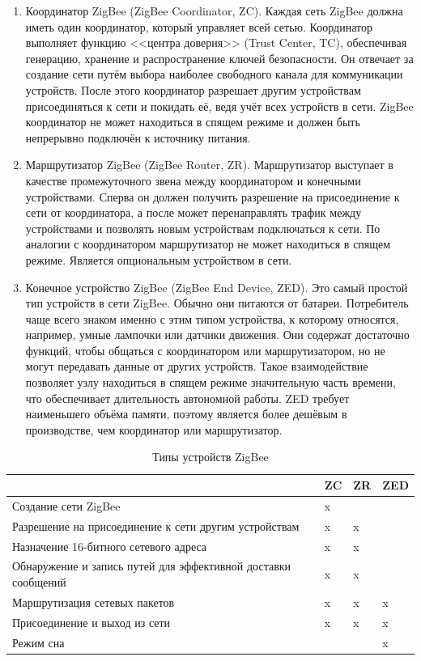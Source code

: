 	\begin{enumerate}
		\item Координатор ZigBee (ZigBee Coordinator, ZC). Каждая сеть ZigBee должна иметь один координатор,
		который управляет всей сетью. Координатор выполняет функцию <<центра доверия>> (Trust Center, TC),
		обеспечивая генерацию, хранение и распространение ключей безопасности. Он отвечает за создание сети
		путём выбора наиболее свободного канала для коммуникации устройств. После этого координатор 
		разрешает другим устройствам присоединяться к сети и покидать её, ведя учёт всех устройств в сети.
		ZigBee координатор не может находиться в спящем режиме и должен быть непрерывно подключён
		к источнику питания.
		\item Маршрутизатор ZigBee (ZigBee Router, ZR). Маршрутизатор выступает в качестве промежуточного
		звена между координатором и конечными устройствами. Сперва он должен получить разрешение на
		присоединение к сети от координатора, а после может перенаправлять трафик между устройствами и 
		позволять новым устройствам подключаться к сети. По аналогии с координатором маршрутизатор не
		может находиться в спящем режиме. Является опциональным устройством в сети.
		\item Конечное устройство ZigBee (ZigBee End Device, ZED). Это самый простой тип устройств в сети
		ZigBee. Обычно они питаются от батареи. Потребитель чаще всего знаком именно с этим типом
		устройства, к которому относятся, например, умные лампочки или датчики движения. Они содержат 
		достаточно функций, чтобы общаться с координатором или маршрутизатором, но не могут передавать 
		данные от других устройств. Такое взаимодействие позволяет узлу находиться в спящем режиме 
		значительную часть времени, что обеспечивает длительность автономной работы. ZED требует 
		наименьшего объёма памяти, поэтому является более дешёвым в производстве, чем координатор 
		или маршрутизатор.
	\end{enumerate}

	\begin{table}[h]
		\centering
		\begin{tabular}{ | p{9cm} | p{1cm} | p{1cm} | p{1cm} | }
			\hline
			& ZC & ZR & ZED \\ \hline
			Создание сети ZigBee & x &  &  \\ \hline
			Разрешение на присоединение к сети другим устройствам & x & x &  \\ \hline
			Назначение 16-битного сетевого адреса & x & x &  \\ \hline
			Обнаружение и запись путей для эффективной доставки сообщений & x & x &  \\ \hline
			Маршрутизация сетевых пакетов & x & x & x \\ \hline
			Присоединение и выход из сети & x & x & x \\ \hline
			Режим сна & & & x \\ \hline
		\end{tabular}
		\caption{Типы устройств ZigBee}
		\label{table-ZigBee-device-types}
	\end{table}
	
